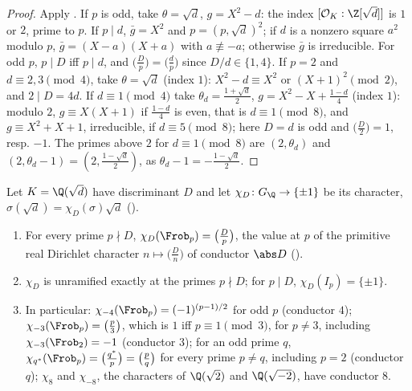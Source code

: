 \begin{proof}
Apply . If $p$ is odd, take $\theta=\sqrt d$, $g=X^2-d$: the index $[\mathcal O_K:\Z[\sqrt d]]$ is $1$ or $2$, prime to $p$. If
$p\mid d$, $\bar g=X^2$ and $p=(p,\sqrt d)^2$; if $d$ is a nonzero square $a^2$ modulo $p$, $\bar g=(X-a)(X+a)$ with $a\not\equiv-a$; otherwise $\bar g$ is
irreducible. For odd $p$, $p\mid D$ iff $p\mid d$, and $\bigl(\frac Dp\bigr)=\bigl(\frac dp\bigr)$ since $D/d\in\{1,4\}$. If $p=2$ and $d\equiv2,3\pmod4$, take
$\theta=\sqrt d$ (index $1$): $X^2-d\equiv X^2$ or $(X+1)^2\pmod 2$, and $2\mid D=4d$. If $d\equiv1\pmod4$ take $\theta_d=\frac{1+\sqrt d}2$, $g=X^2-X+\frac{1-d}4$
(index $1$): modulo $2$, $g\equiv X(X+1)$ if $\frac{1-d}4$ is even, that is $d\equiv1\pmod8$, and $g\equiv X^2+X+1$, irreducible, if $d\equiv5\pmod8$; here
$D=d$ is odd and $\bigl(\frac D2\bigr)=1$, resp. $-1$. The primes above $2$ for $d\equiv1\pmod8$ are $(2,\theta_d)$ and $(2,\theta_d-1)=(2,\frac{1-\sqrt d}2)$, as $\theta_d-1=-\frac{1-\sqrt d}2$.
\end{proof}

\begin{proposition}\label{prop:ant:quadchar}
Let $K=\Q(\sqrt d)$ have discriminant $D$ and let $\chi_D\colon G_\Q\to\{\pm1\}$ be its character, $\sigma(\sqrt d)=\chi_D(\sigma)\sqrt d$ ().
\begin{enumerate}[label=(\roman*)]
\item For every prime $p\nmid D$, $\chi_D(\Frob_p)=\bigl(\frac Dp\bigr)$, the value at $p$ of the primitive real Dirichlet character $n\mapsto\bigl(\frac Dn\bigr)$ of
conductor $\abs D$ ().
\item $\chi_D$ is unramified exactly at the primes $p\nmid D$; for $p\mid D$, $\chi_D(I_p)=\{\pm1\}$.
\item In particular: $\chi_{-4}(\Frob_p)=(-1)^{(p-1)/2}$ for odd $p$ (conductor $4$); $\chi_{-3}(\Frob_p)=\bigl(\frac p3\bigr)$, which is $1$ iff $p\equiv1\pmod3$, for
$p\ne3$, including $\chi_{-3}(\Frob_2)=-1$ (conductor $3$); for an odd prime $q$, $\chi_{q^*}(\Frob_p)=\bigl(\frac{q^*}p\bigr)=\bigl(\frac pq\bigr)$ for every prime
$p\ne q$, including $p=2$ (conductor $q$); $\chi_8$ and $\chi_{-8}$, the characters of $\Q(\sqrt2)$ and $\Q(\sqrt{-2})$, have conductor $8$.
\end{enumerate}
\end{proposition}

